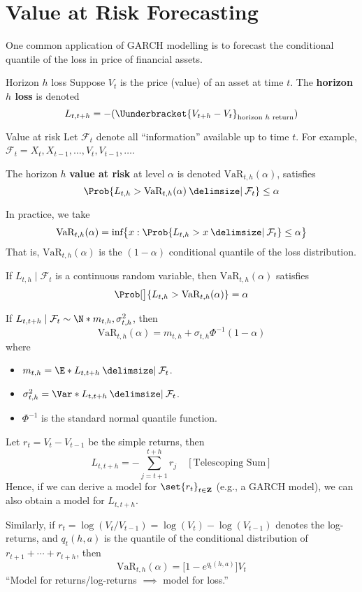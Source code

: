 \section{Value at Risk Forecasting}
One common application of GARCH modelling is to forecast the conditional quantile
of the loss in price of financial assets.
\begin{Definition}{Horizon $ h $ loss}{}
    Suppose $ V_t $ is the price (value) of an asset at time $ t $.
    The \textbf{horizon $h$ loss} is denoted
    \[ L_{t,t+h}=-(\Uunderbracket{V_{t+h}-V_t}_{\text{horizon $ h $ return}}) \]
\end{Definition}
\begin{Definition}{Value at risk}{}
    Let $ \mathcal{F}_t $ denote all ``information'' available up to time $ t $.
    For example, $ \mathcal{F}_t=X_t,X_{t-1},\ldots,V_t,V_{t-1},\ldots $.

    The horizon $ h $ \textbf{value at risk} at level $ \alpha $
    is denoted $ \text{VaR}_{t,h}(\alpha) $, satisfies
    \[ \Prob{L_{t,h}>\text{VaR}_{t,h}(\alpha)\given \mathcal{F}_t}\le \alpha \]
\end{Definition}
In practice, we take
\[ \text{VaR}_{t,h}(\alpha)=\text{inf}\bigl\{x: \Prob{L_{t,h}>x\given\mathcal{F}_t}\le \alpha\bigr\} \]
That is, $ \text{VaR}_{t,h}(\alpha) $ is the $ (1-\alpha) $ conditional quantile
of the loss distribution.
\begin{Remark}{}{}
    If $ L_{t,h}\mid \mathcal{F}_t $ is a continuous random variable, then
    $ \text{VaR}_{t,h}(\alpha) $ satisfies
    \[ \Prob[\big]{L_{t,h}>\text{VaR}_{t,h}(\alpha)}=\alpha \]
\end{Remark}
\begin{Example}{}{}
    If $ L_{t,t+h}\mid\mathcal{F}_t \sim \N*{m_{t,h},\sigma^2_{t,h}} $, then
    \[ \text{VaR}_{t,h}(\alpha)=m_{t,h}+\sigma_{t,h}\Phi^{-1}(1-\alpha) \]
    where
    \begin{itemize}
        \item $ m_{t,h}=\E*{L_{t,t+h}\given \mathcal{F}_t} $.
        \item $ \sigma^2_{t,h}=\Var*{L_{t,t+h}\given \mathcal{F}_t} $.
        \item $ \Phi^{-1} $ is the standard normal quantile function.
    \end{itemize}
\end{Example}
\begin{Remark}{}{}
    Let $ r_t =V_t-V_{t-1} $ be the simple returns, then
    \[ L_{t,t+h}=-\sum_{j=t+1}^{t+h}r_j\quad[\text{Telescoping Sum}]  \]
    Hence, if we can derive a model for $ \set{r_t}_{t\in\mathbf{Z}} $
    (e.g., a GARCH model), we can also obtain a model for $ L_{t,t+h} $.

    \vspace{1mm}

    Similarly, if $ r_t=\log(V_t/V_{t-1})=\log(V_t)-\log(V_{t-1}) $
    denotes the log-returns, and $ q_t(h,a) $ is the quantile
    of the conditional distribution of $ r_{t+1}+\cdots+r_{t+h} $,
    then
    \[ \text{VaR}_{t,h}(\alpha)=\bigl[1-e^{q_t(h,a)}\bigr]V_t \]
    ``Model for returns/log-returns $ \implies  $ model for loss.''
\end{Remark}
